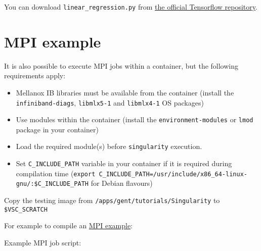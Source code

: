 You can download \lstinline|linear_regression.py| from
\href{https://github.com/tensorflow/tensorflow/blob/r1.12/tensorflow/examples/get_started/regression/linear_regression.py}{the official Tensorflow repository}.

\section{MPI example}

It is also possible to execute MPI jobs within a container, but the following requirements apply:

\begin{itemize}
    \item Mellanox IB libraries must be available from the container (install the \lstinline|infiniband-diags|, \lstinline|libmlx5-1| and \lstinline|libmlx4-1| OS packages)
    \item Use modules within the container (install the \lstinline|environment-modules| or \lstinline|lmod| package in your container)
    \item Load the required module(s) before \lstinline|singularity| execution.
    \item Set \lstinline|C_INCLUDE_PATH| variable in your container if it is required during
        compilation time (\lstinline|export C_INCLUDE_PATH=/usr/include/x86_64-linux-gnu/:$C_INCLUDE_PATH| for Debian flavours)
\end{itemize}

Copy the testing image from \lstinline|/apps/gent/tutorials/Singularity| to \lstinline|$VSC_SCRATCH|

\begin{prompt}
\end{prompt}

For example to compile an
\href{https://github.com/open-mpi/ompi/blob/master/examples/ring_c.c}{MPI example}:

\begin{prompt}
\end{prompt}

Example MPI job script:

